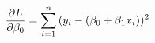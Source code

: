 \documentclass[preview]{standalone}
\begin{document}
\begin{align*}
\special{dvisvgm:raw <g id='unique000'>}\frac{\partial L}{\partial \beta_0} = \sum_{i=1}^n{(y_i-(\beta_0+\beta_1 x_i)})^2\special{dvisvgm:raw </g>}
\end{align*}
\end{document}
